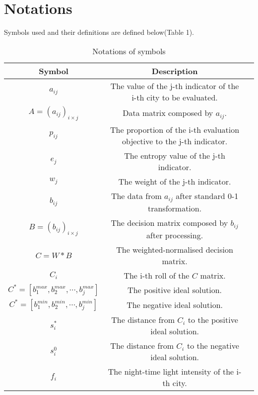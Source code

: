 \section{Notations}
Symbols used and their definitions are defined below(Table 1).
\begin{table}[H] \centering
    \caption{Notations of symbols}
    \begin{tabular}{ccl}
        \toprule
        Symbol & Description\\ \hline
        $a_{ij}$ & The value of the j-th indicator of the i-th city to be evaluated. \\
        $A=(a_{ij})_{i\times j}$ & Data matrix composed by $a_{ij}$. \\
        $p_{ij}$ & The proportion of the i-th evaluation objective to the j-th indicator. \\
        $e_j$ & The entropy value of the j-th indicator. \\
        $w_j$ & The weight of the j-th indicator. \\
        $b_{ij}$ & The data from $a_{ij}$ after standard 0-1 transformation.\\
        $B=(b_{ij})_{i\times j}$ & The decision matrix composed by $b_{ij}$ after processing.\\
        $C=W*B$ & The weighted-normalised decision matrix. \\
        $C_i$ & The i-th roll of the $C$ matrix. \\
        $C^*=[b_1^{max},b_2^{max},\cdots,b_j^{max}]$ & The positive ideal solution. \\
        $C^*=[b_1^{min},b_2^{min},\cdots,b_j^{min}]$ & The negative ideal solution. \\
        $s_i^*$ & The distance from $C_i$ to the positive ideal solution. \\
        $s_i^0$ & The distance from $C_i$ to the negative ideal solution. \\
        $f_i$ & The night-time light intensity of the i-th city. \\
        \bottomrule
    \end{tabular}
\end{table}
